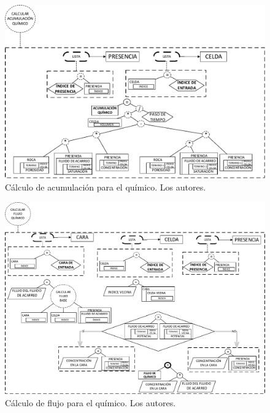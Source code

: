 \begin{figure}[h]
	\centering%
	\includegraphics[width=0.9\linewidth]{Fig/CalcularAcumulacionQuimico.pdf}%
	\caption[Cálculo de acumulación para el químico.]{Cálculo de acumulación para el químico. Los autores.} \label{fig:ChemicalAccumulation}
\end{figure}

\begin{figure}[h]
	\centering%
	\includegraphics[width=0.9\linewidth]{Fig/CalcularFlujoQuimico.pdf}%
	\caption[Cálculo de flujo para el químico.]{Cálculo de flujo para el químico. Los autores.} \label{fig:ChemicalFlow}
\end{figure}

